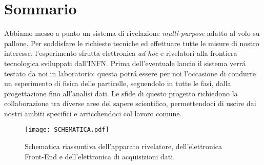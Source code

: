 \section{Sommario}

Abbiamo messo a punto un sistema di rivelazione \emph{multi-purpose} adatto al volo su pallone. Per soddisfare le richieste tecniche ed effettuare tutte le misure di nostro interesse, l'esperimento sfrutta elettronica \emph{ad hoc} e rivelatori alla frontiera tecnologica sviluppati dall'INFN. Prima dell'eventuale lancio il sistema verr\'a testato da noi in laboratorio: questa potr\'a essere per noi l'occasione di condurre un esperimento di fisica delle particelle, seguendolo in tutte le fasi, dalla progettazione fino all'analisi dati. Le sfide di questo progetto richiedono la collaborazione tra diverse aree del sapere scientifico, permettendoci di uscire dai nostri ambiti specifici e arricchendoci col lavoro comune.

\begin{figure}[h]
\centering
\texttt{[image: SCHEMATICA.pdf]}
\caption{Schematica riassuntiva dell'apparato rivelatore, dell'elettronica Front-End e dell'elettronica di acquisizioni dati.}
\label{schematica}
\end{figure}
